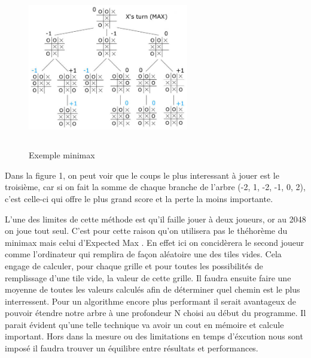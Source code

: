 \documentclass{article}
\begin{document}
\begin{figure}[!h]
   \includegraphics[width=7cm,height=7cm]{minimax.jpg}
   \caption{\label{minimax} Exemple minimax}
\end{figure}

Dans la figure 1, on peut voir que le coups le plus interessant à jouer est le troisi\`eme, car si on fait la somme de chaque branche de l'arbre (-2, 1, -2, -1, 0, 2), c'est celle-ci qui offre le plus grand score et la perte la moins importante.

L'une des limites de cette m\'ethode est qu'il faille jouer \`a deux joueurs, or au 2048 on joue tout seul. C'est pour cette raison qu'on utilisera pas le th\'ehor\`eme du \og minimax \fg{} mais celui d'\og Expected Max \fg{}. En effet ici on concid\`erera le second joueur comme l'ordinateur qui remplira de façon aléatoire une des tiles vides. Cela engage de calculer, pour chaque grille et pour toutes les possibilit\'es de remplissage d'une tile vide, la valeur de cette grille. Il faudra ensuite faire une moyenne de toutes les valeurs calculés afin de déterminer quel chemin est le plus interressent. Pour un algorithme encore plus performant il serait avantageux de pouvoir \'etendre notre arbre \`a une profondeur N choisi au d\'ebut du programme. Il parait évident qu'une telle technique va avoir un cout en mémoire et calcule important. Hors dans la mesure ou des limitations en temps d'éxcution nous sont imposé il faudra trouver un équilibre entre résultats et performances.
\end{document}
